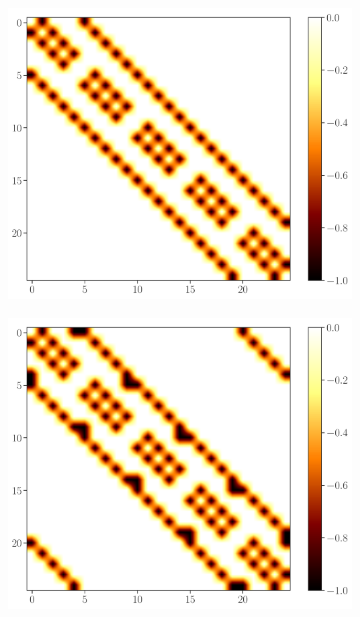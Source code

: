\documentclass[11pt, a4paper, oneside]{book}
\theoremstyle{definition} %
\begin{document}
\begin{figure}[h]
\centering
		\begin{subfigure}[b]{0.31\textwidth}
			\includegraphics[width=\textwidth]{ColorMapMatrix_OBC_2D}
			\caption{}
		\end{subfigure}
		\begin{subfigure}[b]{0.31\textwidth}
			\includegraphics[width=\textwidth]{ColorMapMatrix_PBC_2D}
			\caption{}
		\end{subfigure}
		\begin{subfigure}[b]{0.31\textwidth}

\end{subfigure}
\end{figure}
\end{document}
